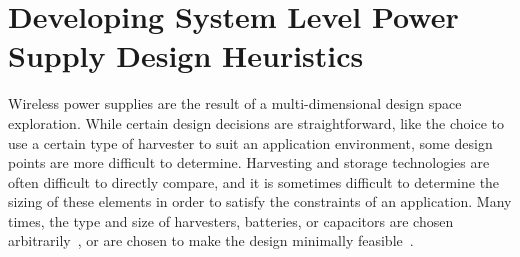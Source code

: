 \chapter{
Developing System Level Power Supply Design Heuristics
}

\label{chap:intuition}

Wireless power supplies are the result of a multi-dimensional design space exploration.
While certain design decisions are straightforward, like the choice to use a certain type of harvester to suit an application environment, some design points are more difficult to determine. 
Harvesting and storage technologies are often difficult to directly compare, and it is sometimes difficult to determine the sizing of these elements in order to satisfy the constraints of an application. 
Many times, the type and size of harvesters, batteries, or capacitors are chosen arbitrarily~\cite{hamiltoniot,lee2013modular,juang2002energy}, or are chosen to make the design minimally feasible~\cite{yervaGrafting12,debruin2013monjolo,hesterFlicker17,afanasov2020battery}.


